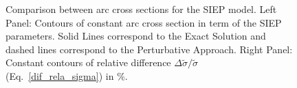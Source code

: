 \documentclass[useAMS,usenatbib]{mn2e}
\begin{document}
\begin{figure}
\begin{center}
\caption{\label{dcs_siep} Comparison between arc cross sections for the SIEP model. Left Panel: Contours of constant arc cross section in term of the SIEP parameters. Solid Lines correspond to the Exact Solution and dashed lines correspond to the Perturbative Approach.  Right Panel: Constant contours of  relative difference $\Delta\tilde{\sigma}/\tilde{\sigma}$ (Eq.~\ref{dif_rela_sigma}) in \%.}
\end{center}
\end{figure}
\end{document}
